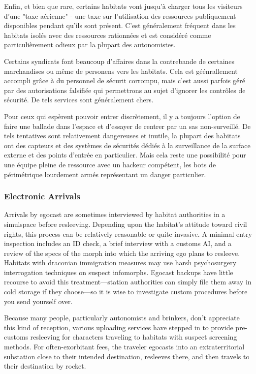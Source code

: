 Enfin, et bien que rare, certains habitats vont jusqu'à charger tous les visiteurs d'une "taxe aérienne" - une taxe sur l'utilisation des ressources publiquement disponibles pendant qu'ils sont présent. C'est généralement fréquent dans les habitats isolés avec des ressources rationnées et est considéré comme particulièrement odieux par la plupart des autonomistes. 

Certains syndicats font beaucoup d'affaires dans la contrebande de certaines marchandises ou même de personens vers les habitats. Cela est géénrallement accompli grâce à du personnel de sécurit corrompu, mais c'est aussi parfois géré par des autorisations falsifiée qui permettrons au sujet d'ignorer les contrôles de sécurité. De tels services sont généralement chers. 

Pour ceux qui espèrent pouvoir entrer discrètement, il y a toujours l'option de faire une ballade dans l'espace et d'essayer de rentrer par un sas non-surveillé. De tels tentatives sont relativement dangereuses et inutile, la plupart des habitats ont des capteurs et des systèmes de sécurités dédiés à la surveillance de la surface externe et des points d'entrée en particulier. Mais cela reste une possibilité pour une équipe pleine de ressource avec un hackeur compétent, les bots de périmétrique lourdement armés représentant un danger particulier. 

\subsubsection{Electronic Arrivals} 

Arrivals by egocast are sometimes interviewed by habitat authorities in a simulspace before resleeving. Depending upon the habitat's attitude toward civil rights, this process can be relatively reasonable or quite invasive. A minimal entry inspection includes an ID check, a brief interview with a customs AI, and a review of the specs of the morph into which the arriving ego plans to resleeve. Habitats with draconian immigration measures may use harsh psychosurgery interrogation techniques on suspect infomorphs. Egocast backups have little recourse to avoid this treatment—station authorities can simply file them away in cold storage if they choose—so it is wise to investigate custom procedures before you send yourself over. 

Because many people, particularly autonomists and brinkers, don't appreciate this kind of reception, various uploading services have stepped in to provide pre-customs resleeving for characters traveling to habitats with suspect screening methods. For often-exorbitant fees, the traveler egocasts into an extraterritorial substation close to their intended destination, resleeves there, and then travels to their destination by rocket. 

